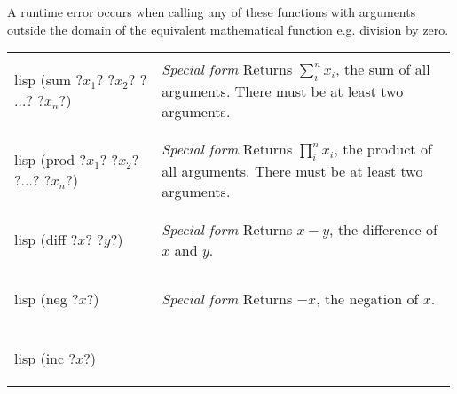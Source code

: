 \documentclass[a4paper, 12pt]{article}
\makeatletter
\newenvironment{funcdefs}
    {\begin{longtable}{@{} x{0.33\linewidth} @{} >{\raggedright\arraybackslash}p{0.66\linewidth} @{}}}
    {\end{longtable}}
\def\specialf/{\textit{Special form}\hspace{0.5em}}
\makeatother
\begin{document}
A runtime error occurs when calling any of these functions with arguments outside the domain of the equivalent mathematical function e.g. division by zero.

\begin{funcdefs}
    \begin{minipage}[t]{\linewidth}
        \centering
        \begin{cminted}[autogobble=true, escapeinside=??]{lisp}
            (sum ?$x_1$? ?$x_2$? ?$\ldots$? ?$x_n$?)
        \end{cminted}
    \end{minipage}
    & \specialf/ Returns $\sum_{i}^{n}{x_i}$, the sum of all arguments. There must be at least two arguments.
    \\ \\
    \begin{minipage}[t]{\linewidth}
        \centering
        \begin{cminted}[autogobble=true, escapeinside=??]{lisp}
            (prod ?$x_1$? ?$x_2$? ?$\ldots$? ?$x_n$?)
        \end{cminted}
    \end{minipage}
    & \specialf/ Returns $\prod_{i}^{n}{x_i}$, the product of all arguments. There must be at least two arguments.
    \\ \\
    \begin{minipage}[t]{\linewidth}
        \centering
        \begin{cminted}[autogobble=true, escapeinside=??]{lisp}
            (diff ?$x$? ?$y$?)
        \end{cminted}
    \end{minipage}
    & \specialf/ Returns $x - y$, the difference of $x$ and $y$.
    \\ \\
    \begin{minipage}[t]{\linewidth}
        \centering
        \begin{cminted}[autogobble=true, escapeinside=??]{lisp}
            (neg ?$x$?)
        \end{cminted}
    \end{minipage}
    & \specialf/ Returns $-x$, the negation of $x$.
    \\ \\
    \begin{minipage}[t]{\linewidth}
        \centering
        \begin{cminted}[autogobble=true, escapeinside=??]{lisp}
            (inc ?$x$?)

\end{cminted}
\end{minipage}
\end{funcdefs}
\end{document}
